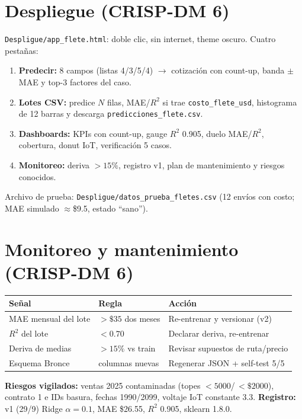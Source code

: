 \documentclass[11pt]{article}
\begin{document}
\section{Despliegue (CRISP-DM 6)}
\texttt{Despligue/app\_flete.html}: doble clic, sin internet, theme oscuro. Cuatro pestañas:
\begin{enumerate}[leftmargin=*]
\item \textbf{Predecir:} 8 campos (listas 4/3/5/4) $\to$ cotización con count-up, banda $\pm$MAE y top-3 factores del caso.
\item \textbf{Lotes CSV:} predice $N$ filas, MAE/$R^2$ si trae \texttt{costo\_flete\_usd}, histograma de 12 barras y descarga \texttt{predicciones\_flete.csv}.
\item \textbf{Dashboards:} KPIs con count-up, gauge $R^2$ 0.905, duelo MAE/$R^2$, cobertura, donut IoT, verificación 5 casos.
\item \textbf{Monitoreo:} deriva $>15\%$, registro v1, plan de mantenimiento y riesgos conocidos.
\end{enumerate}
Archivo de prueba: \texttt{Despligue/datos\_prueba\_fletes.csv} (12 envíos con costo; MAE simulado $\approx$\$9.5, estado ``sano'').
\section{Monitoreo y mantenimiento (CRISP-DM 6)}
\begin{center}
{\small
\begin{tabular}{lll}
\toprule Señal & Regla & Acción \\
\midrule MAE mensual del lote & $>\$35$ dos meses & Re-entrenar y versionar (v2) \\
$R^2$ del lote & $<0.70$ & Declarar deriva, re-entrenar \\
Deriva de medias & $>15\%$ vs train & Revisar supuestos de ruta/precio \\
Esquema Bronce & columnas nuevas & Regenerar JSON + self-test 5/5 \\
\bottomrule
\end{tabular}}
\end{center}
\textbf{Riesgos vigilados:} ventas 2025 contaminadas (topes $<5000$/\,$<\$2000$),
contrato 1 e IDs basura, fechas 1990/2099, voltaje IoT constante 3.3.
\textbf{Registro:} v1 (29/9) Ridge $\alpha{=}0.1$, MAE \$26.55, $R^2$ 0.905, sklearn 1.8.0.
\end{document}
